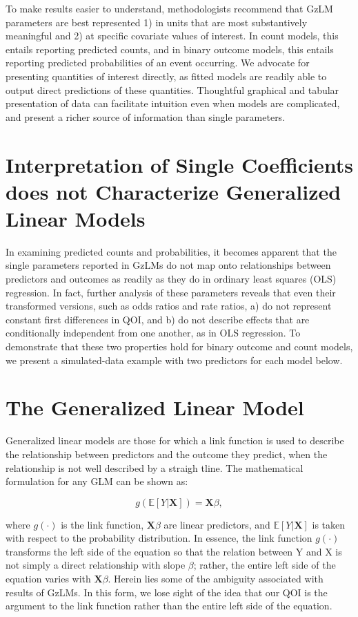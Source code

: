 \documentclass[jou, apacite]{apa6}
\begin{document}
To make results easier to understand, methodologists recommend that GzLM parameters are best represented 1) in units that are most substantively meaningful and 2) at specific covariate values of interest.
In count models, this entails reporting predicted counts, and in binary outcome models, this entails reporting predicted probabilities of an event occurring. 
We advocate for presenting quantities of interest directly, as fitted models are readily able to output direct predictions of these quantities. 
Thoughtful graphical and tabular presentation of data can facilitate intuition even when models are complicated, and present a richer source of information than single parameters. 

\section{Interpretation of Single Coefficients does not Characterize Generalized Linear Models}
In examining predicted counts and probabilities, it becomes apparent that the single parameters reported in GzLMs do not map onto relationships between predictors and outcomes as readily as they do in ordinary least squares (OLS) regression. 
In fact, further analysis of these parameters reveals that even their transformed versions, such as odds ratios and rate ratios, a) do not represent constant first differences in QOI, and b) do not describe effects that are conditionally independent from one another, as in OLS regression. 
To demonstrate that these two properties hold for binary outcome and count models, we present a simulated-data example with two predictors for each model below. 


\section{The Generalized Linear Model}
Generalized linear models are those for which a link function is used to describe the relationship between predictors and the outcome they predict, when the relationship is not well described by a straigh tline. 
The mathematical formulation for any GLM can be shown as:

\begin{equation}
g(\mathbb{E}[Y|\bm{X}]) = \bm{X} \beta ,
\end{equation}

where $g(\cdot)$ is the link function, $\bm{X}\beta$ are linear predictors, and $\mathbb{E}[Y|\bm{X}]$ is taken with respect to the probability distribution. In essence, the link function $g(\cdot)$ transforms the left side of the equation so that the relation between Y and X is not simply a direct relationship with slope $\beta$; rather, the entire left side of the equation varies with $\bm{X}\beta$.
Herein lies some of the ambiguity associated with results of GzLMs.
In this form, we lose sight of the idea that our QOI is the argument to the link function rather than the entire left side of the equation.
\end{document}
